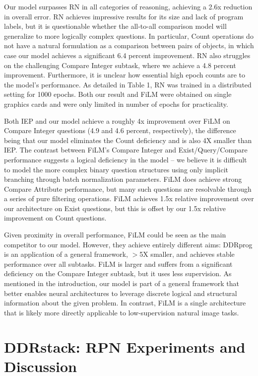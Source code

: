 \documentclass{article}
\begin{document}
Our model surpasses RN in all categories of reasoning, achieving a 2.6x reduction in overall error. RN achieves impressive results for its size and lack of program labels, but it is questionable whether the all-to-all comparison model will generalize to more logically complex questions. In particular, Count operations do not have a natural formulation as a comparison between pairs of objects, in which case our model achieves a significant 6.4 percent improvement. RN also struggles on the challenging Compare Integer subtask, where we achieve a 4.8 percent improvement. Furthermore, it is unclear how essential high epoch counts are to the model's performance. As detailed in Table 1, RN was trained in a distributed setting for 1000 epochs. Both our result and FiLM were obtained on single graphics cards and were only limited in number of epochs for practicality.

Both IEP and our model achieve a roughly 4x improvement over FiLM on Compare Integer questions (4.9 and 4.6 percent, respectively), the difference being that our model eliminates the Count deficiency and is also 4X smaller than IEP. The contrast between FiLM's Compare Integer and Exist/Query/Compare performance suggests a logical deficiency in the model -- we believe it is difficult to model the more complex binary question structures using only implicit branching through batch normalization parameters. FiLM does achieve strong Compare Attribute performance, but many such questions are resolvable through a series of pure filtering operations. FiLM achieves 1.5x relative improvement over our architecture on Exist questions, but this is offset by our 1.5x relative improvement on Count questions. 

Given proximity in overall performance, FiLM could be seen as the main competitor to our model. However, they achieve entirely different aims: DDRprog is an application of a general framework, $>$5X smaller, and achieves stable performance over all subtasks. FiLM is larger and suffers from a significant deficiency on the Compare Integer subtask, but it uses less supervision. As mentioned in the introduction, our model is part of a general framework that better enables neural architectures to leverage discrete logical and structural information about the given problem. In contrast, FiLM is a single architecture that is likely more directly applicable to low-supervision natural image tasks.

\section{DDRstack: RPN Experiments and Discussion}
\end{document}
